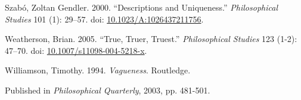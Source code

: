 \documentclass[
  10pt,
  letterpaper,
  DIV=11,
  numbers=noendperiod,
  twoside]{scrartcl}
\newlength{\cslhangindent}
\newenvironment{CSLReferences}[2] %
 {\begin{list}{}{%
  \setlength{\itemindent}{0pt}
  \setlength{\leftmargin}{0pt}
  \setlength{\parsep}{0pt}
  \ifodd #1
   \setlength{\leftmargin}{\cslhangindent}
   \setlength{\itemindent}{-1\cslhangindent}
  \fi
  \setlength{\itemsep}{#2\baselineskip}}}
 {\end{list}}
\begin{document}
\begin{CSLReferences}{1}{0}
Szabó, Zoltan Gendler. 2000. {``Descriptions and Uniqueness.''}
\emph{Philosophical Studies} 101 (1): 29--57. doi:
\href{https://doi.org/10.1023/A:1026437211756}{10.1023/A:1026437211756}.

Weatherson, Brian. 2005. {``{True, Truer, Truest}.''}
\emph{Philosophical Studies} 123 (1-2): 47--70. doi:
\href{https://doi.org/10.1007/s11098-004-5218-x}{10.1007/s11098-004-5218-x}.

Williamson, Timothy. 1994. \emph{{Vagueness}}. Routledge.

\end{CSLReferences}



\noindent Published in\emph{
Philosophical Quarterly}, 2003, pp. 481-501.
\end{document}
